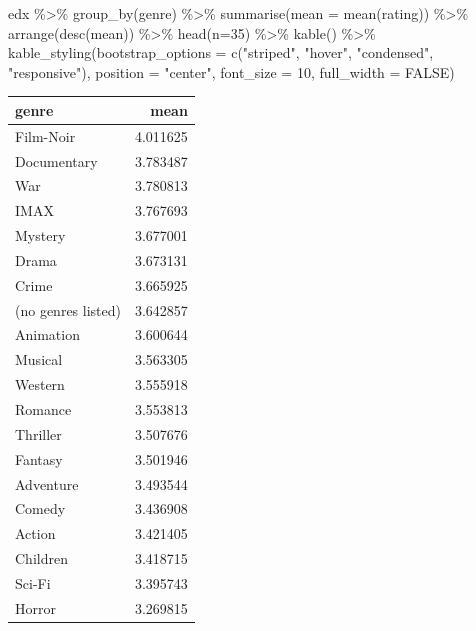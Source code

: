 \documentclass[
]{article}
\newenvironment{Shaded}{}{}
\newcommand{\AttributeTok}[1]{\textcolor[rgb]{0.49,0.56,0.16}{#1}}
\newcommand{\ConstantTok}[1]{\textcolor[rgb]{0.53,0.00,0.00}{#1}}
\newcommand{\DecValTok}[1]{\textcolor[rgb]{0.25,0.63,0.44}{#1}}
\newcommand{\FunctionTok}[1]{\textcolor[rgb]{0.02,0.16,0.49}{#1}}
\newcommand{\NormalTok}[1]{#1}
\newcommand{\SpecialCharTok}[1]{\textcolor[rgb]{0.25,0.44,0.63}{#1}}
\newcommand{\StringTok}[1]{\textcolor[rgb]{0.25,0.44,0.63}{#1}}
\begin{document}
\begin{Shaded}
\begin{Highlighting}[]
\NormalTok{edx }\SpecialCharTok{\%\textgreater{}\%}
   \FunctionTok{group\_by}\NormalTok{(genre) }\SpecialCharTok{\%\textgreater{}\%}
   \FunctionTok{summarise}\NormalTok{(}\AttributeTok{mean =} \FunctionTok{mean}\NormalTok{(rating)) }\SpecialCharTok{\%\textgreater{}\%}
   \FunctionTok{arrange}\NormalTok{(}\FunctionTok{desc}\NormalTok{(mean)) }\SpecialCharTok{\%\textgreater{}\%}
   \FunctionTok{head}\NormalTok{(}\AttributeTok{n=}\DecValTok{35}\NormalTok{) }\SpecialCharTok{\%\textgreater{}\%}
   \FunctionTok{kable}\NormalTok{() }\SpecialCharTok{\%\textgreater{}\%}
   \FunctionTok{kable\_styling}\NormalTok{(}\AttributeTok{bootstrap\_options =} \FunctionTok{c}\NormalTok{(}\StringTok{"striped"}\NormalTok{, }\StringTok{"hover"}\NormalTok{, }\StringTok{"condensed"}\NormalTok{, }\StringTok{"responsive"}\NormalTok{),}
                 \AttributeTok{position =} \StringTok{"center"}\NormalTok{,}
                 \AttributeTok{font\_size =} \DecValTok{10}\NormalTok{,}
                 \AttributeTok{full\_width =} \ConstantTok{FALSE}\NormalTok{)}
\end{Highlighting}
\end{Shaded}

\begin{table}
\centering\begingroup\fontsize{10}{12}\selectfont

\begin{tabular}{l|r}
\hline
genre & mean\\
\hline
Film-Noir & 4.011625\\
\hline
Documentary & 3.783487\\
\hline
War & 3.780813\\
\hline
IMAX & 3.767693\\
\hline
Mystery & 3.677001\\
\hline
Drama & 3.673131\\
\hline
Crime & 3.665925\\
\hline
(no genres listed) & 3.642857\\
\hline
Animation & 3.600644\\
\hline
Musical & 3.563305\\
\hline
Western & 3.555918\\
\hline
Romance & 3.553813\\
\hline
Thriller & 3.507676\\
\hline
Fantasy & 3.501946\\
\hline
Adventure & 3.493544\\
\hline
Comedy & 3.436908\\
\hline
Action & 3.421405\\
\hline
Children & 3.418715\\
\hline
Sci-Fi & 3.395743\\
\hline
Horror & 3.269815\\
\hline
\end{tabular}
\endgroup{}
\end{table}
\end{document}
